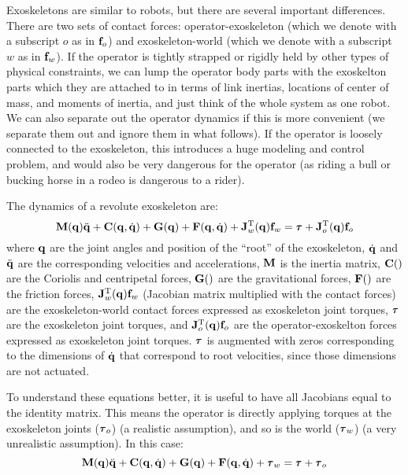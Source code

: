 \documentclass[letterpaper,12pt,fullpage]{article}
\begin{document}
Exoskeletons are similar to robots, but there are several important differences.
There are two sets of contact forces: operator-exoskeleton (which we denote
with a subscript $o$ as in ${\bf f}_o$) and exoskeleton-world (which we denote
with a subscript $w$ as in ${\bf f}_w$). If the operator is tightly strapped or
rigidly held by other types of physical constraints, we can lump the operator
body parts with the exoskelton parts which they are attached to in terms
of link inertias, locations of center of mass, and moments of inertia,
and just think of the whole system as one robot.
We can also separate out the operator dynamics if this is more convenient
(we separate them out and ignore them in what follows).
If the operator is loosely connected to the exoskeleton, this introduces a
huge modeling and control problem, and would also be very dangerous for the
operator (as riding a bull or bucking horse in a rodeo is dangerous to a rider).

The dynamics of a revolute exoskeleton are:
\begin{equation}
\mM(\vq) \ddot{\vq} + \mC(\vq,\dot{\vq}) + \mG(\vq) + \mF(\vq,\dot{\vq})
+ \mJ_w^{\tr}(\vq) \vf_w = \vtau + \mJ_o^{\tr}(\vq) \vf_o
\label{eq:dynamics}
\end{equation}
where ${\bf q}$ are the joint angles and position of the ``root'' of
the exoskeleton, $\dot{{\bf q}}$ and $\ddot{{\bf q}}$ are the corresponding
velocities and accelerations, ${\bf M}$ is the inertia matrix, ${\bf C}()$ are the Coriolis and
centripetal forces, ${\bf G}()$ are the gravitational forces, ${\bf F}()$ are the
friction forces, ${\bf J}_w^{{\rm T}}({\bf q}) {\bf f}_w$ (Jacobian matrix multiplied with the
contact forces)
are the exoskeleton-world
contact forces 
expressed as exoskeleton joint torques, 
$\vtau$ are the exoskeleton
joint torques,
and ${\bf J}_o^{{\rm T}}({\bf q}) {\bf f}_o$
are the operator-exoskelton forces expressed
as exoskeleton joint torques.
$\vtau$ is augmented with zeros corresponding to the dimensions of $\dot{{\bf q}}$
that correspond to root velocities, since those dimensions are not actuated.

To understand these equations better, it is useful to have all Jacobians equal
to the identity matrix. This means the operator is directly applying torques
at the exoskeleton joints ($\vtau_o$) (a realistic assumption), 
and so is the world ($\vtau_w$) (a very unrealistic assumption). In this case:
\begin{equation}
\mM(\vq) \ddot{\vq} + \mC(\vq,\dot{\vq}) + \mG(\vq) + \mF(\vq,\dot{\vq})
+ \vtau_w = \vtau + \vtau_o
\end{equation}
\end{document}
